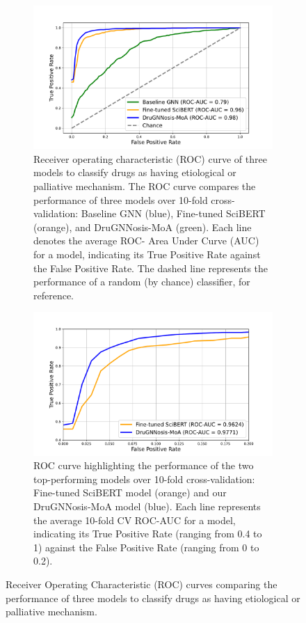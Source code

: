 \documentclass[journal,twoside,web]{ieeecolor}
\begin{document}
\begin{figure}[H]
\centering
\begin{subfigure}[H]{\linewidth}
   \includegraphics[width=\linewidth]{Figures/3_Models_Roc.pdf}
   \caption{
    Receiver operating characteristic (ROC) curve of three models to classify drugs as having etiological or palliative mechanism.
    The ROC curve compares the performance of three models over 10-fold cross-validation: Baseline GNN (blue), Fine-tuned SciBERT (orange), and DruGNNosis-MoA (green).
    Each line denotes the average ROC- Area Under Curve (AUC) for a model, indicating its True Positive Rate against the False Positive Rate.
    The dashed line represents the performance of a random (by chance) classifier, for reference.}
   \label{fig:roc_auc1a}
\end{subfigure}
\begin{subfigure}[H]{\linewidth}
   \includegraphics[width=\linewidth]{Figures/LLM_GNN_ROC_AUC.pdf}
   \caption{
    ROC curve highlighting the performance of the two top-performing models over 10-fold cross-validation: Fine-tuned SciBERT model (orange) and our DruGNNosis-MoA model (blue).
    Each line represents the average 10-fold CV ROC-AUC for a model, indicating its True Positive Rate (ranging from 0.4 to 1) against the False Positive Rate (ranging from 0 to 0.2).}
   \label{fig:roc_auc1b}
\end{subfigure}
\caption{Receiver Operating Characteristic (ROC) curves comparing the performance of three models to classify drugs as having etiological or palliative mechanism.}
\label{fig:roc_auc1}
\end{figure}
\end{document}
